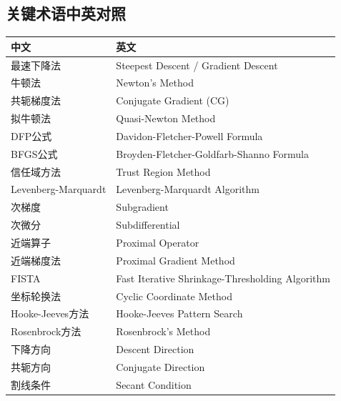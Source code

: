 \subsection{关键术语中英对照}

\begin{table}[H]
\centering
\begin{tabular}{@{}ll@{}}
\toprule
\textbf{中文} & \textbf{英文} \\
\midrule
最速下降法 & Steepest Descent / Gradient Descent \\
牛顿法 & Newton's Method \\
共轭梯度法 & Conjugate Gradient (CG) \\
拟牛顿法 & Quasi-Newton Method \\
DFP公式 & Davidon-Fletcher-Powell Formula \\
BFGS公式 & Broyden-Fletcher-Goldfarb-Shanno Formula \\
信任域方法 & Trust Region Method \\
Levenberg-Marquardt & Levenberg-Marquardt Algorithm \\
次梯度 & Subgradient \\
次微分 & Subdifferential \\
近端算子 & Proximal Operator \\
近端梯度法 & Proximal Gradient Method \\
FISTA & Fast Iterative Shrinkage-Thresholding Algorithm \\
坐标轮换法 & Cyclic Coordinate Method \\
Hooke-Jeeves方法 & Hooke-Jeeves Pattern Search \\
Rosenbrock方法 & Rosenbrock's Method \\
下降方向 & Descent Direction \\
共轭方向 & Conjugate Direction \\
割线条件 & Secant Condition \\
\bottomrule
\end{tabular}
\end{table}

\newpage

